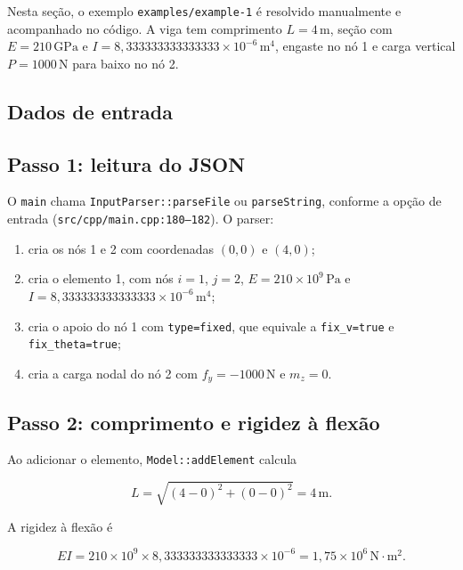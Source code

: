\documentclass[12pt,a4paper]{article}
\newcommand{\unit}[1]{\,\mathrm{#1}}
\begin{document}
Nesta seção, o exemplo \texttt{examples/example-1} é resolvido manualmente e acompanhado no código. A viga tem comprimento \(L=4\unit{m}\), seção com \(E=210\unit{GPa}\) e \(I=8{,}333333333333333\times10^{-6}\unit{m^4}\), engaste no nó 1 e carga vertical \(P=1000\unit{N}\) para baixo no nó 2.

\subsection{Dados de entrada}



\subsection{Passo 1: leitura do JSON}

O \texttt{main} chama \texttt{InputParser::parseFile} ou \texttt{parseString}, conforme a opção de entrada (\texttt{src/cpp/main.cpp:180--182}). O parser:

\begin{enumerate}[leftmargin=1.5em]
  \item cria os nós 1 e 2 com coordenadas \((0,0)\) e \((4,0)\);
  \item cria o elemento 1, com nós \(i=1\), \(j=2\), \(E=210\times10^9\unit{Pa}\) e \(I=8{,}333333333333333\times10^{-6}\unit{m^4}\);
  \item cria o apoio do nó 1 com \texttt{type=fixed}, que equivale a \texttt{fix\_v=true} e \texttt{fix\_theta=true};
  \item cria a carga nodal do nó 2 com \(f_y=-1000\unit{N}\) e \(m_z=0\).
\end{enumerate}

\subsection{Passo 2: comprimento e rigidez à flexão}

Ao adicionar o elemento, \texttt{Model::addElement} calcula

\begin{equation}
  L = \sqrt{(4-0)^2+(0-0)^2}=4\unit{m}.
  \label{eq:ex_L}
\end{equation}

A rigidez à flexão é

\begin{equation}
  EI = 210\times10^9 \times 8{,}333333333333333\times10^{-6}
     = 1{,}75\times10^6\unit{N\cdot m^2}.
  \label{eq:ex_EI}
\end{equation}
\end{document}
